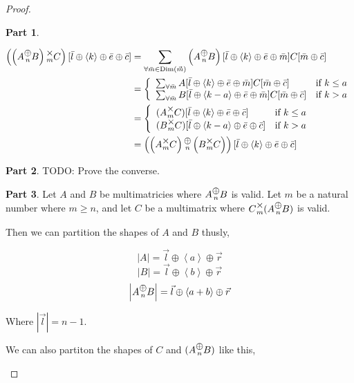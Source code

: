 \documentclass[12pt]{book}
\theoremstyle{plain}
\theoremstyle{definition}
\theoremstyle{ppart}
\newtheorem{ppart}{Part}
\theoremstyle{case}
\theoremstyle{solution}
\DeclareMathOperator{\Dim}{Dim}
\newcommand{\mmult}[1]{\text{\raisebox{1ex}{$\underset{#1}{\times}$}}}
\newcommand{\mconcat}[1]{\text{\raisebox{1ex}{$\underset{#1}{\oplus}$}}}
\newcommand{\shape}[1]{\left|#1\right|}
\begin{document}
\begin{proof}
\begin{ppart}
\begin{landscape}
\begin{align*}
  \left(\left(A \mconcat{n} B\right) \mmult{m} C\right)[\bar{l} \oplus \left<k\right> \oplus \bar{e} \oplus \bar{c}]
  &= \sum_{\forall \bar{m} \in \Dim(\vec{m})} \left(A \mconcat{n} B\right)[\bar{l} \oplus \left<k\right> \oplus \bar{e} \oplus \bar{m}] C[\bar{m} \oplus \bar{c}] \\
  &= \left\{
  \begin{array}{ll}
    \sum_{\forall \bar{m}} A[\bar{l} \oplus \left<k\right> \oplus \bar{e} \oplus \bar{m}] C[\bar{m} \oplus \bar{c}] 
    & \mbox{if } k \le a \\
    \sum_{\forall \bar{m}} B[\bar{l} \oplus \left<k-a\right> \oplus \bar{e} \oplus \bar{m}] C[\bar{m} \oplus \bar{c}] 
    & \mbox{if } k > a
  \end{array}
  \right. \\
  &= \left\{
  \begin{array}{ll}
    (A \mmult{m} C)[\bar{l} \oplus \left<k\right> \oplus \bar{e} \oplus \bar{c}]
    & \mbox{if } k \le a \\
    (B \mmult{m} C)[\bar{l} \oplus \left<k-a\right> \oplus \bar{e} \oplus \bar{c}]
    & \mbox{if } k > a
  \end{array}
  \right. \\
  &= 
    \left(\left(A \mmult{m} C\right) \mconcat{n} \left(B \mmult{m} C\right)\right)
    [\bar{l} \oplus \left<k\right> \oplus \bar{e} \oplus \bar{c}]
\end{align*}
\end{landscape}
\end{ppart}

\begin{ppart}
TODO: Prove the converse.
\end{ppart}

\begin{ppart}
Let $A$ and $B$ be multimatricies where $A \mconcat{n} B$ is valid. 
Let $m$ be a natural number where $m \ge n$, and let $C$ be a multimatrix where
$C \mmult{m} (A \mconcat{n} B)$ is valid.

Then we can partition the shapes of $A$ and $B$ thusly,

\[ \shape{A} = \vec{l} \oplus \left<a\right> \oplus \vec{r} \]
\[ \shape{B} = \vec{l} \oplus \left<b\right> \oplus \vec{r} \]
\[ \shape{A \mconcat{n} B} = \vec{l} \oplus \left<a+b\right> \oplus \vec{r} \]

Where $\shape{\vec{l}} = n-1$. 

We can also partiton the shapes of $C$ and $(A \mconcat{n} B)$ like this,


\end{ppart}
\end{proof}
\end{document}

